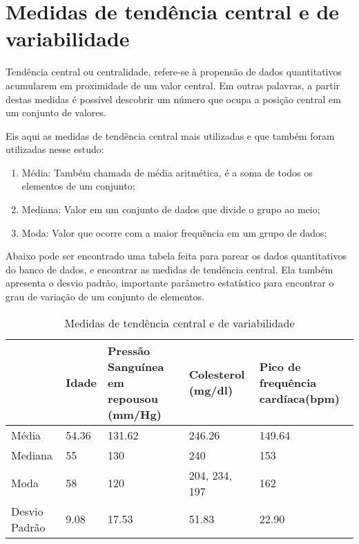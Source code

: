\chapter{Medidas de tendência central e de variabilidade}

    Tendência central ou centralidade, refere-se à propensão de dados quantitativos acumularem
    em proximidade de um valor central. Em outras palavras, a partir destas medidas é possível 
    descobrir um número que ocupa a posição central em um conjunto de valores.

    Eis aqui as medidas de tendência central mais utilizadas e que também foram utilizadas nesse 
    estudo:

    \begin{enumerate}[label={\alph*)}]
      \addtolength{\itemindent}{1.25cm}
      \item Média: Também chamada de média aritmética, é a soma de todos os elementos de um conjunto;
      \item Mediana: Valor em um conjunto de dados que divide o grupo ao meio;
      \item Moda: Valor que ocorre com a maior frequência em um grupo de dados;
    \end{enumerate}

    Abaixo pode ser encontrado uma tabela feita para parear os dados quantitativos do banco de dados, 
    e encontrar as medidas de tendência central. Ela também apresenta o desvio padrão, importante 
    parâmetro estatístico para encontrar o grau de variação de um conjunto de elementos.

    \begin{table}[htb]
      \caption{Medidas de tendência central e de variabilidade}
      \centering
        \begin{tabular}{ |P{2.8cm} |P{2cm}|P{3cm}|P{3cm}|P{3cm}|  }
          \hline
            & Idade & Pressão Sanguínea em repousou     (mm/Hg) & Colesterol  (mg/dl) & Pico de frequência cardíaca(bpm)\\
          \hline
          Média & 54.36 & 131.62 & 246.26 & 149.64 \\
          \hline
          Mediana & 55 & 130 & 240 & 153 \\
          \hline
          Moda & 58 & 120 & 204, 234, 197 & 162 \\
          \hline
          Desvio Padrão & 9.08 & 17.53 & 51.83 & 22.90 \\
          \hline
        \end{tabular}
    \end{table}

